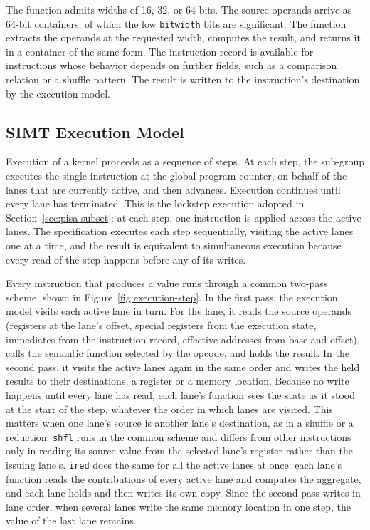 The function admits widths of 16, 32, or 64 bits. The source operands
arrive as 64-bit containers, of which the low \texttt{bitwidth} bits are
significant. The function extracts the operands at the requested width,
computes the result, and returns it in a container of the same form. The
instruction record is available for instructions whose behavior depends on further fields, such as a
comparison relation or a shuffle pattern. The
result is written to the instruction's destination by the execution
model.

\subsection{SIMT Execution Model}
\label{sec:asl-execution}

Execution of a kernel proceeds as a sequence of steps. At each step, the
sub-group executes the single instruction at the global program counter, on
behalf of the lanes that are currently active, and then advances. Execution
continues until every lane has terminated. This is the lockstep execution
adopted in Section~\ref{sec:pisa-subset}: at each step, one instruction is
applied across the active lanes. The specification executes each step
sequentially, visiting the active lanes one at a time, and the result is
equivalent to simultaneous execution because every read of the step happens
before any of its writes.

Every instruction that produces a value runs through a common two-pass
scheme, shown in Figure~\ref{fig:execution-step}. In the first pass, the
execution model visits each active lane in turn. For the lane, it reads
the source operands (registers at the lane's offset, special registers
from the execution state, immediates from the instruction record,
effective addresses from base and offset), calls the semantic function
selected by the opcode, and holds the result. In the second pass, it
visits the active lanes again in the same order and writes the held
results to their destinations, a register or a memory location. Because
no write happens until every lane has read, each lane's function sees the
state as it stood at the start of the step, whatever the order in which
lanes are visited. This matters when one lane's source is another lane's
destination, as in a shuffle or a reduction. \texttt{shfl} runs in the
common scheme and differs from other instructions only in reading its
source value from the selected lane's register rather than the issuing
lane's. \texttt{ired} does the same for all the active lanes at once: each
lane's function reads the contributions of every active lane and computes
the aggregate, and each lane holds and then writes its own copy. Since
the second pass writes in lane order, when several lanes write the same
memory location in one step, the value of the last lane remains.

